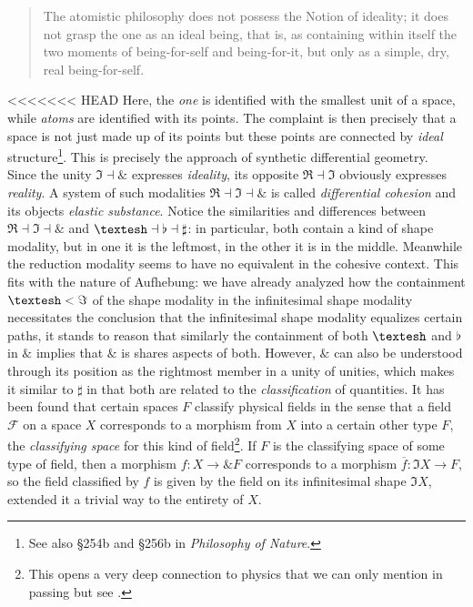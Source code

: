 \documentclass{article}
\begin{document}
\begin{quote}
    The atomistic philosophy does not possess the Notion of ideality; it does not grasp the one as an
ideal being, that is, as containing within itself the two moments of being-for-self and being-for-it,
but only as a simple, dry, real being-for-self.
\end{quote}

<<<<<<< HEAD
Here, the \emph{one} is identified with the smallest unit of a space, while \emph{atoms} are identified with
its points. The complaint is then precisely that a space is not just made up of its points but these points
are connected by \emph{ideal} structure\footnote{See also §254b and §256b in \emph{Philosophy of Nature}.}.
This is precisely the approach of synthetic differential geometry. \\

Since the unity $\Im\dashv\&$ expresses \emph{ideality}, its opposite $\Re\dashv\Im$ obviously expresses
\emph{reality}. A system of such modalities $\Re\dashv\Im\dashv\&$ is called \emph{differential cohesion} and
its objects \emph{elastic substance}. Notice the similarities and differences between $\Re\dashv\Im\dashv\&$
and $\textrm{\textesh}\dashv\flat\dashv\sharp$: in particular, both contain a kind of shape modality, but in
one it is the leftmost, in the other it is in the middle. Meanwhile the reduction modality seems to have no
equivalent in the cohesive context. This fits with the nature of Aufhebung: we have already analyzed how the
containment $\textrm{\textesh}<\Im$ of the shape modality in the infinitesimal shape modality necessitates
the conclusion that the infinitesimal shape modality equalizes certain paths, it stands to reason that
similarly the containment of both $\textrm{\textesh}$ and $\flat$ in $\&$ implies that $\&$ is shares aspects
of both. However, $\&$ can also be understood through its position as the rightmost member in a unity of
unities, which makes it similar to $\sharp$ in that both are related to the \emph{classification} of
quantities. It has been found that certain spaces $F$ classify physical fields in the sense that a field
$\mathcal{F}$ on a space $X$ corresponds to a morphism from $X$ into a certain other type $F$, the
\emph{classifying space} for this kind of field\footnote{This opens a very deep connection to physics that we
can only mention in passing but see \cite{dcct}.}. If $F$ is the classifying space of some type of field,
then a morphism $f:X\rightarrow \& F$ corresponds to a morphism $\overline{f}:\Im X\rightarrow F$, so the
field classified by $f$ is given by the field on its infinitesimal shape $\Im X$, extended it a trivial way
to the entirety of $X$.   \\
\end{document}
